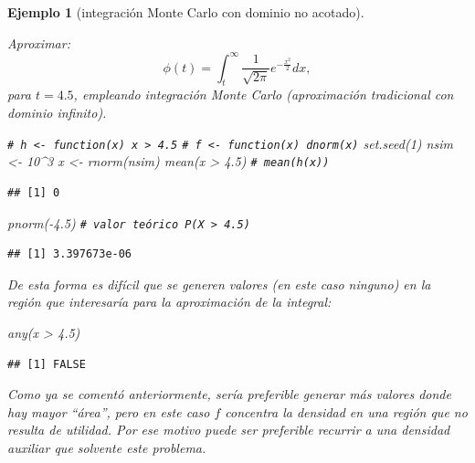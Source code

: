 \documentclass[
]{book}
\newenvironment{Shaded}{\begin{snugshade}}{\end{snugshade}}
\newcommand{\CommentTok}[1]{\textcolor[rgb]{0.56,0.35,0.01}{\textit{#1}}}
\newcommand{\DecValTok}[1]{\textcolor[rgb]{0.00,0.00,0.81}{#1}}
\newcommand{\FloatTok}[1]{\textcolor[rgb]{0.00,0.00,0.81}{#1}}
\newcommand{\FunctionTok}[1]{\textcolor[rgb]{0.00,0.00,0.00}{#1}}
\newcommand{\NormalTok}[1]{#1}
\newcommand{\OtherTok}[1]{\textcolor[rgb]{0.56,0.35,0.01}{#1}}
\newcommand{\SpecialCharTok}[1]{\textcolor[rgb]{0.00,0.00,0.00}{#1}}
\theoremstyle{break}
\newtheorem{example}{Ejemplo}[chapter]
\theoremstyle{nonumberplain}
\renewcommand{\CommentTok}[1]{\textcolor[rgb]{0.41,0.41,0.41}{\texttt{#1}}}
\begin{document}
\begin{example}[integración Monte Carlo con dominio no acotado]
\protect\hypertarget{exm:mc-intinf}{}\label{exm:mc-intinf}

Aproximar:
\[\phi(t)=\int_{t}^{\infty}\frac1{\sqrt{2\pi}}e^{-\frac{x^2}2}dx,\]
para \(t=4.5\), empleando integración Monte Carlo (aproximación tradicional con dominio infinito).

\begin{Shaded}
\begin{Highlighting}[]
\CommentTok{\# h \textless{}{-} function(x) x \textgreater{} 4.5}
\CommentTok{\# f \textless{}{-} function(x) dnorm(x)}
\FunctionTok{set.seed}\NormalTok{(}\DecValTok{1}\NormalTok{)}
\NormalTok{nsim }\OtherTok{\textless{}{-}} \DecValTok{10}\SpecialCharTok{\^{}}\DecValTok{3}
\NormalTok{x }\OtherTok{\textless{}{-}} \FunctionTok{rnorm}\NormalTok{(nsim)}
\FunctionTok{mean}\NormalTok{(x }\SpecialCharTok{\textgreater{}} \FloatTok{4.5}\NormalTok{) }\CommentTok{\# mean(h(x))}
\end{Highlighting}
\end{Shaded}

\begin{verbatim}
## [1] 0
\end{verbatim}

\begin{Shaded}
\begin{Highlighting}[]
\FunctionTok{pnorm}\NormalTok{(}\SpecialCharTok{{-}}\FloatTok{4.5}\NormalTok{)  }\CommentTok{\# valor teórico P(X \textgreater{} 4.5) }
\end{Highlighting}
\end{Shaded}

\begin{verbatim}
## [1] 3.397673e-06
\end{verbatim}

De esta forma es difícil que se generen valores (en este caso ninguno) en la región que interesaría para la aproximación de la integral:

\begin{Shaded}
\begin{Highlighting}[]
\FunctionTok{any}\NormalTok{(x }\SpecialCharTok{\textgreater{}} \FloatTok{4.5}\NormalTok{)}
\end{Highlighting}
\end{Shaded}

\begin{verbatim}
## [1] FALSE
\end{verbatim}

Como ya se comentó anteriormente, sería preferible generar más valores donde hay mayor ``área'', pero en este caso \(f\) concentra la densidad en una región que no resulta de utilidad.
Por ese motivo puede ser preferible recurrir a una densidad auxiliar que solvente este problema.
\end{example}
\end{document}
